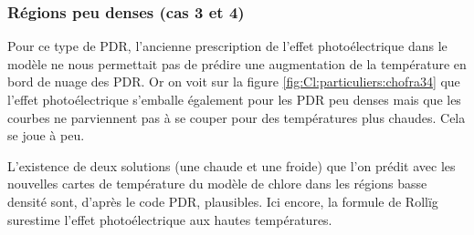 \subsubsection{Régions peu denses (cas 3 et 4)}

Pour ce type de PDR, l'ancienne prescription de l'effet photoélectrique dans le modèle ne nous permettait pas de prédire une augmentation de la température en bord de nuage des PDR. Or on voit sur la figure \ref{fig:Cl:particuliers:chofra34} que l'effet photoélectrique s'emballe également pour les PDR peu denses mais que les courbes ne parviennent pas à se couper pour des températures plus chaudes. Cela se joue à peu. \newline

L'existence de deux solutions (une chaude et une froide) que l'on prédit avec les nouvelles cartes de température du modèle de chlore dans les régions basse densité sont, d'après le code PDR, plausibles. Ici encore, la formule de Rollïg surestime l'effet photoélectrique aux hautes températures. 

